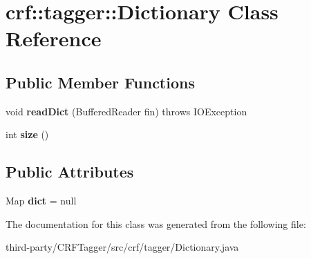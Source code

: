 \hypertarget{classcrf_1_1tagger_1_1Dictionary}{
\section{crf::tagger::Dictionary Class Reference}
\label{classcrf_1_1tagger_1_1Dictionary}
}
\subsection*{Public Member Functions}
\begin{DoxyCompactItemize}
\item 
\hypertarget{classcrf_1_1tagger_1_1Dictionary_aef1b48afb99c99512d19027d0d8831f6}{
void {\bfseries readDict} (BufferedReader fin)  throws IOException }
\label{classcrf_1_1tagger_1_1Dictionary_aef1b48afb99c99512d19027d0d8831f6}

\item 
\hypertarget{classcrf_1_1tagger_1_1Dictionary_ae597dd44d2c30b1cce1822941cf27f6f}{
int {\bfseries size} ()}
\label{classcrf_1_1tagger_1_1Dictionary_ae597dd44d2c30b1cce1822941cf27f6f}

\end{DoxyCompactItemize}
\subsection*{Public Attributes}
\begin{DoxyCompactItemize}
\item 
\hypertarget{classcrf_1_1tagger_1_1Dictionary_a63e1a01717403bc76845f3d183027c0a}{
Map {\bfseries dict} = null}
\label{classcrf_1_1tagger_1_1Dictionary_a63e1a01717403bc76845f3d183027c0a}

\end{DoxyCompactItemize}


The documentation for this class was generated from the following file:\begin{DoxyCompactItemize}
\item 
third-\/party/CRFTagger/src/crf/tagger/Dictionary.java\end{DoxyCompactItemize}
